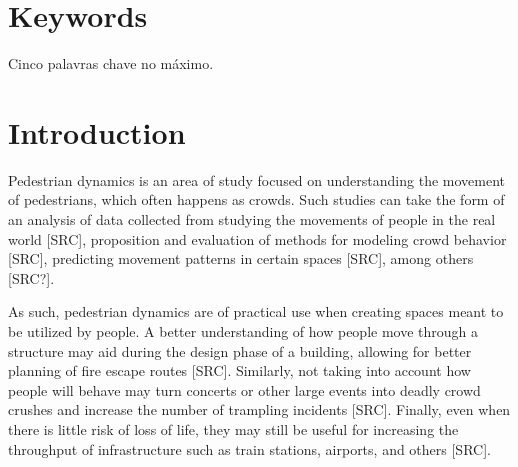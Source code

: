 \documentclass[twoside, 11pt]{article}
\begin{document}
\section*{Keywords}

Cinco palavras chave no máximo.

\clearpage            %
\null                %
\newpage             %

\printglossary[type=\acronymtype,nonumberlist, title=List of Abbreviations]

\clearpage            %
\null                %
\newpage             %

\renewcommand{\contentsname}{General Index}
\tableofcontents

\clearpage            %
\null                %
\newpage             %

\renewcommand{\listfigurename}{Figure Index}
\listoffigures

\clearpage            %
\null                %
\newpage             %

\renewcommand{\listtablename}{Table Index}
\listoftables

\clearpage            %
\null                %
\newpage             %

\mainmatter

\section{Introduction}

Pedestrian dynamics is an area of study focused on understanding the movement of pedestrians, which often happens as crowds. Such studies can take the form of an analysis of data collected from studying the movements of people in the real world [SRC], proposition and evaluation of methods for modeling crowd behavior [SRC], predicting movement patterns in certain spaces [SRC], among others [SRC?].

As such, pedestrian dynamics are of practical use when creating spaces meant to be utilized by people. A better understanding of how people move through a structure may aid during the design phase of a building, allowing for better planning of fire escape routes [SRC]. Similarly, not taking into account how people will behave may turn concerts or other large events into deadly crowd crushes and increase the number of trampling incidents [SRC]. Finally, even when there is little risk of loss of life, they may still be useful for increasing the throughput of infrastructure such as train stations, airports, and others [SRC].
\end{document}
